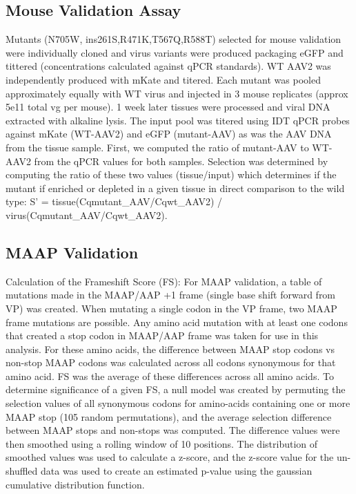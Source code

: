 \subsection{Mouse Validation Assay}
Mutants (N705W, ins261S,R471K,T567Q,R588T) selected for mouse validation were individually cloned and virus variants were produced packaging eGFP and tittered (concentrations calculated against qPCR standards). WT AAV2 was independently produced with mKate and titered. Each mutant was pooled approximately equally with WT virus and injected in 3 mouse replicates (approx 5e11 total vg per mouse). 1 week later tissues were processed and viral DNA extracted with alkaline lysis. The input pool was titered using IDT qPCR probes against mKate (WT-AAV2) and eGFP (mutant-AAV) as was the AAV DNA from the tissue sample. First, we computed the ratio of mutant-AAV to WT-AAV2 from the qPCR values for both samples. Selection was determined by computing the ratio of these two values (tissue/input) which determines if the mutant if enriched or depleted in a given tissue in direct comparison to the wild type: S’ = tissue(Cqmutant\_AAV/Cqwt\_AAV2) / virus(Cqmutant\_AAV/Cqwt\_AAV2).

\subsection{MAAP Validation}
Calculation of the Frameshift Score (FS): For MAAP validation, a table of mutations made in the MAAP/AAP +1 frame (single base shift forward from VP) was created. When mutating a single codon in the VP frame, two MAAP frame mutations are possible. Any amino acid mutation with at least one codons that created a stop codon in MAAP/AAP frame was taken for use in this analysis. For these amino acids, the difference between MAAP stop codons vs non-stop MAAP codons was calculated across all codons synonymous for that amino acid. FS was the average of these differences across all amino acids. To determine significance of a given FS, a null model was created by permuting the selection values of all synonymous codons for amino-acids containing one or more MAAP stop (105 random permutations), and the average selection difference between MAAP stops and non-stops was computed. The difference values were then smoothed using a rolling window of 10 positions.  The distribution of smoothed values was used to calculate a z-score, and the z-score value for the un-shuffled data was used to create an estimated p-value using the gaussian cumulative distribution function.


